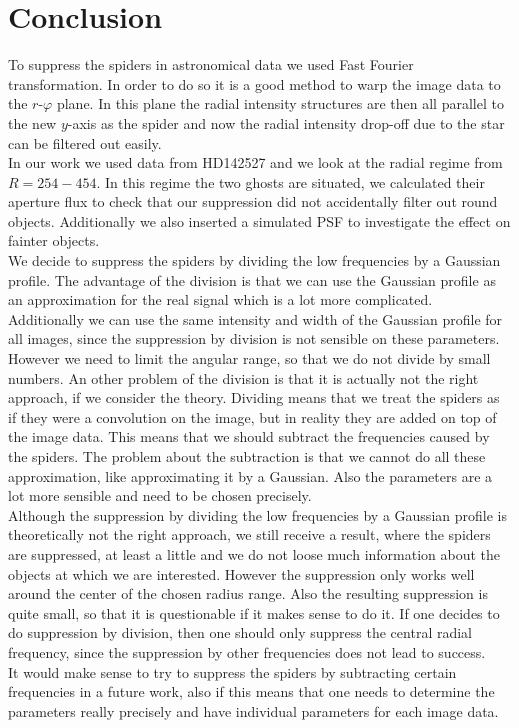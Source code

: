 \section{Conclusion}
To suppress the spiders in astronomical data we used Fast Fourier transformation. In order to do so it is a good method to warp the image data to the $r$-$\varphi$ plane. In this plane the radial intensity structures are then all parallel to the new $y$-axis as the spider and now the radial intensity drop-off due to the star can be filtered out easily.\\
In our work we used data from HD142527 and we look at the radial regime from $R=254-454$. In this regime the two ghosts are situated, we calculated their aperture flux to check that our suppression did not accidentally filter out round objects. Additionally we also inserted a simulated PSF to investigate the effect on fainter objects. \\
We decide to suppress the spiders by dividing the low frequencies by a Gaussian profile. The advantage of the division is that we can use the Gaussian profile as an approximation for the real signal which is a lot more complicated. Additionally we can use the same intensity and width of the Gaussian profile for all images, since the suppression by division is not sensible on these parameters. However we need to limit the angular range, so that we do not divide by small numbers. An other problem of the division is that it is actually not the right approach, if we consider the theory. Dividing means that we treat the spiders as if they were a convolution on the image, but in reality they are added on top of the image data. This means that we should subtract the frequencies caused by the spiders. The problem about the subtraction is that we cannot do all these approximation, like approximating it by a Gaussian. Also the parameters are a lot more sensible and need to be chosen precisely. \\
Although the suppression by dividing the low frequencies by a Gaussian profile is theoretically not the right approach, we still receive a result, where the spiders are suppressed, at least a little and we do not loose much information about the objects at which we are interested. However the suppression only works well around the center of the chosen radius range. Also the resulting suppression is quite small, so that it is questionable if it makes sense to do it. If one decides to do suppression by division, then one should only suppress the central radial frequency, since the suppression by other frequencies does not lead to success.\\ 
It would make sense to try to suppress the spiders by subtracting certain frequencies in a future work, also if this means that one needs to determine the parameters really precisely and have individual parameters for each image data. 
 
